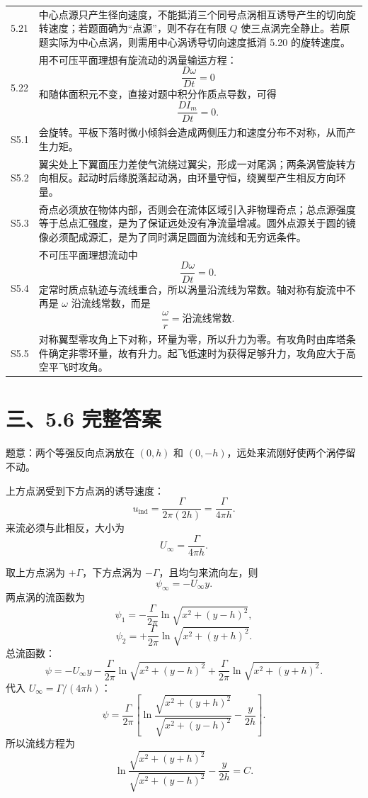 ﻿\documentclass[UTF8,zihao=-4]{ctexart}
\begin{document}
\begin{longtable}{p{1.3cm}p{12.6cm}}
5.21 &
中心点源只产生径向速度，不能抵消三个同号点涡相互诱导产生的切向旋转速度；若题面确为“点源”，则不存在有限 $Q$ 使三点涡完全静止。若原题实际为中心点涡，则需用中心涡诱导切向速度抵消 5.20 的旋转速度。\\

5.22 &
用不可压平面理想有旋流动的涡量输运方程：
\[
\frac{D\omega}{Dt}=0
\]
和随体面积元不变，直接对题中积分作质点导数，可得
\[
\frac{D I_m}{Dt}=0.
\]\\

S5.1 &
会旋转。平板下落时微小倾斜会造成两侧压力和速度分布不对称，从而产生力矩。\\

S5.2 &
翼尖处上下翼面压力差使气流绕过翼尖，形成一对尾涡；两条涡管旋转方向相反。起动时后缘脱落起动涡，由环量守恒，绕翼型产生相反方向环量。\\

S5.3 &
奇点必须放在物体内部，否则会在流体区域引入非物理奇点；总点源强度等于总点汇强度，是为了保证远处没有净流量增减。圆外点源关于圆的镜像必须配成源汇，是为了同时满足圆面为流线和无穷远条件。\\

S5.4 &
不可压平面理想流动中
\[
\frac{D\omega}{Dt}=0.
\]
定常时质点轨迹与流线重合，所以涡量沿流线为常数。轴对称有旋流中不再是 $\omega$ 沿流线常数，而是
\[
\frac{\omega}{r}=\text{沿流线常数}.
\]\\

S5.5 &
对称翼型零攻角上下对称，环量为零，所以升力为零。有攻角时由库塔条件确定非零环量，故有升力。起飞低速时为获得足够升力，攻角应大于高空平飞时攻角。\\

\bottomrule
\end{longtable}

\section*{三、5.6 完整答案}

题意：两个等强反向点涡放在 $(0,h)$ 和 $(0,-h)$，远处来流刚好使两个涡停留不动。

上方点涡受到下方点涡的诱导速度：
\[
u_{\text{ind}}=\frac{\Gamma}{2\pi(2h)}
=\frac{\Gamma}{4\pi h}.
\]
来流必须与此相反，大小为
\[
U_\infty=\frac{\Gamma}{4\pi h}.
\]

取上方点涡为 $+\Gamma$，下方点涡为 $-\Gamma$，且均匀来流向左，则
\[
\psi_\infty=-U_\infty y.
\]
两点涡的流函数为
\[
\psi_1=-\frac{\Gamma}{2\pi}\ln\sqrt{x^2+(y-h)^2},
\]
\[
\psi_2=+\frac{\Gamma}{2\pi}\ln\sqrt{x^2+(y+h)^2}.
\]
总流函数：
\[
\psi
=-U_\infty y
-\frac{\Gamma}{2\pi}\ln\sqrt{x^2+(y-h)^2}
+\frac{\Gamma}{2\pi}\ln\sqrt{x^2+(y+h)^2}.
\]
代入 $U_\infty=\Gamma/(4\pi h)$：
\[
\psi=
\frac{\Gamma}{2\pi}
\left[
\ln
\frac{\sqrt{x^2+(y+h)^2}}
{\sqrt{x^2+(y-h)^2}}
-\frac{y}{2h}
\right].
\]
所以流线方程为
\[
\boxed{
\ln
\frac{\sqrt{x^2+(y+h)^2}}
{\sqrt{x^2+(y-h)^2}}
-\frac{y}{2h}=C
}.
\]
\end{document}
